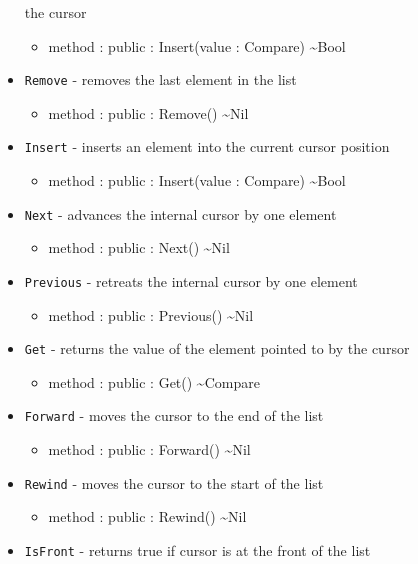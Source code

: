 \documentclass[11pt]{article}
\begin{document}
\begin{itemize}
  the cursor
  \begin{itemize}
  \item method : public : Insert(value : Compare) \textasciitilde Bool
  \end{itemize}
\item \texttt{Remove} - removes the last element in the list
  \begin{itemize}
  \item method : public : Remove() \textasciitilde Nil
  \end{itemize}
\item \texttt{Insert} - inserts an element into the current cursor
  position
  \begin{itemize}
  \item method : public : Insert(value : Compare) \textasciitilde Bool
  \end{itemize}
\item \texttt{Next} - advances the internal cursor by one element
  \begin{itemize}
  \item method : public : Next() \textasciitilde Nil
  \end{itemize}
\item \texttt{Previous} - retreats the internal cursor by one element
  \begin{itemize}
  \item method : public : Previous() \textasciitilde Nil
  \end{itemize}
\item \texttt{Get} - returns the value of the element pointed to by
  the cursor
  \begin{itemize}
  \item method : public : Get() \textasciitilde Compare
  \end{itemize}
\item \texttt{Forward} - moves the cursor to the end of the list
  \begin{itemize}
  \item method : public : Forward() \textasciitilde Nil
  \end{itemize}
\item \texttt{Rewind} - moves the cursor to the start of the list
  \begin{itemize}
  \item method : public : Rewind() \textasciitilde Nil
  \end{itemize}
\item \texttt{IsFront} - returns true if cursor is at the front of the
  list

\end{itemize}
\end{document}
